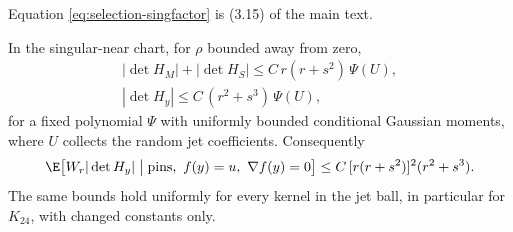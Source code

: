 Equation \eqref{eq:selection-singfactor} is (3.15) of the main text.

\begin{lemma}\label{lem:selection-envelope}
In the singular-near chart, for $\rho$ bounded away from zero,
\begin{gather}
|\det H_M|+|\det H_S|\le C\,r(r+s^2)\,\Psi(U),\label{eq:selection-endenv}\\
|\det H_y|\le C\,(r^2+s^3)\,\Psi(U),\label{eq:selection-thirdenv}
\end{gather}
for a fixed polynomial $\Psi$ with uniformly bounded conditional Gaussian moments, where $U$ collects the random jet coefficients. Consequently
\begin{equation}\label{eq:selection-envelope}
\E\bigl[W_r|\det H_y|\bigm|\text{pins},\ f(y)=u,\ \nabla f(y)=0\bigr]\le C\,[r(r+s^2)]^2(r^2+s^3).
\end{equation}
The same bounds hold uniformly for every kernel in the jet ball, in particular for $K_{24}$, with changed constants only.
\end{lemma}

